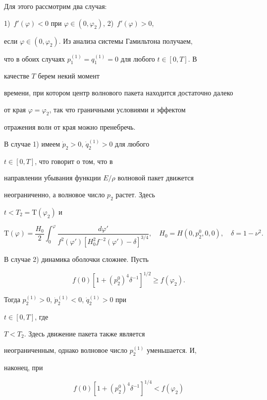 Для этого рассмотрим два случая: 


1)~$f'(\varphi)<0$ при $\varphi\in(0,\varphi_2)$, 2)~$f'(\varphi)>0$, 


если $\varphi\in(0,\varphi_2)$. Из анализа системы Гамильтона получаем, 


что в обоих случаях $p^{(1)}_1=q^{(1)}_1=0$ для любого $t\in[0,T]$. В 


качестве $T$ берем некий момент 


времени, при котором центр волнового пакета находится достаточно далеко 


от края $\varphi=\varphi_2$, так что граничными условиями и эффектом 


отражения волн от края можно пренебречь. 


 


В случае 1) имеем $\Dot p_2>0$, $\Dot q^{(1)}_2>0$ для любого 


$t\in[0,T]$, что говорит о том, что в 


направлении убывания функции $E/\rho$ волновой пакет движется 


неограниченно, а волновое число $p_2$ растет. Здесь 


$t<T_2=\mathrm{T}(\varphi_2)$ и 


$$ 


\mathrm{T}(\varphi)=\frac{H_0}{2}\int^\varphi_0 


\frac{d\varphi'}{f^2(\varphi')[H^2_0f^{-2}(\varphi')- 


\delta]^{3/4}},\quad H_0=H(0,p^0_2,0,0),\quad 


\delta=1-\nu^2. 


$$ 


 


В случае 2) динамика оболочки сложнее. Пусть 


$$ 


f(0)[1+(p^0_2)^4\delta^{-1}]^{1/2}\ge f(\varphi_2). 


$$ 


Тогда $p^{(1)}_2>0$, $\Dot p^{(1)}_2<0$, $\Dot q^{(1)}_2>0$ при 


$t\in[0,T]$, где 


$T<T_2$. Здесь движение пакета также является 


неограниченным, однако волновое число $p^{(1)}_2$ уменьшается. И, 


наконец, при 


\begin{equation} 


f(0)[1+(p^0_2)^4\delta^{-1}]^{1/4}< f(\varphi_2) 


\end{equation} 


